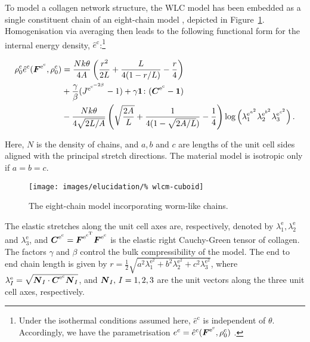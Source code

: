 To model a collagen network structure, the WLC model has been embedded
as a single constituent chain of an eight-chain model
\citep{Bischoffetal:2002, Bischoffetal1:2002}, depicted in
\mbox{Figure~\ref{eight-chain-model}}.  Homogenisation via averaging
then leads to the following functional form for the internal energy
density, $\hat{e}^\mathrm{c}$:\footnote{Under the isothermal
  conditions assumed here, $\hat{e}^\mathrm{c}$ is independent of
  $\theta$. Accordingly, we have the parametrisation
  ${e}^\mathrm{c}=\hat{e}^\mathrm{c}
  (\mbox{\boldmath$ F$}^{\mathrm{e}^\mathrm{c}},\rho^\mathrm{c}_{0})$ .}

\begin{equation}
\begin{split}
\rho^\mathrm{c}_{0}\hat{e}^\mathrm{c}
(\mbox{\boldmath$ F$}^{\mathrm{e}^\mathrm{c}},\rho^\mathrm{c}_{0}) &= \frac{N k
  \theta}{4 A}\left(\frac{r^2}{2L} + \frac{L}{4(1-r/L)} -
\frac{r}{4}\right)\\ & +
\frac{\gamma}{\beta}({J^{\mathrm{e}^{\mathrm{c}^{-2\beta}}}} -1) +
\gamma{\bf 1}\colon(\mbox{\boldmath$ C$}^{\mathrm{e}^{\mathrm{c}}}-{\bf 1})\\ &-\frac{N
  k \theta}{4\sqrt{2L/A}}\left(\sqrt{\frac{2A}{L}} + \frac{1}{4(1 -
  \sqrt{2A/L})} -\frac{1}{4} \right)
\log\left(\lambda_1^{{\mathrm{e}}^{a^\mathrm{2}}}
\lambda_2^{{\mathrm{e}}^{b^\mathrm{2}}}
\lambda_3^{{\mathrm{e}}^{c^\mathrm{2}}}\right).
\label{wlcm-energy}
\end{split}
\end{equation}

Here, $N$ is the density of chains, and $a,b$ and $c$ are lengths of
the unit cell sides aligned with the principal stretch directions. The
material model is isotropic only if $a=b=c$.

\begin{figure}
  \centering {}  
    
   
  \texttt{[image: images/elucidation/\%
    wlcm-cuboid]}
  \caption{The eight-chain model incorporating worm-like chains.}
  \label{eight-chain-model}
\end{figure}

The elastic stretches along the unit cell axes are, respectively,
denoted by $\lambda_1^{\mathrm{e}}, \lambda_2^{\mathrm{e}}$ and
$\lambda_3^{\mathrm{e}}$, and $\mbox{\boldmath$ C$}^{\mathrm{e}^{\mathrm{c}}} =
\mbox{\boldmath$ F$}^{\mathrm{e}^{\mathrm{c}^{\mathrm{T}}}}
\mbox{\boldmath$ F$}^{\mathrm{e}^{\mathrm{c}}}$ is the elastic right Cauchy-Green
tensor of collagen. The factors $\gamma$ and $\beta$ control the bulk
compressibility of the model. The end to end chain length is given by
$r = \frac{1}{2}\sqrt{a^2\lambda_1^{\mathrm{e}^2} +
  b^2\lambda_2^{\mathrm{e}^2}+c^2\lambda_3^{\mathrm{e}^2}}$, where
$\lambda^\mathrm{e}_I =
\sqrt{\mbox{\boldmath$ N$}_I\cdot\mbox{\boldmath$ C$}^{\mathrm{e}^{\mathrm{c}}}\mbox{\boldmath$ N$}_I}$, and $\mbox{\boldmath$ N$}_I,\,I =
1,2,3$ are the unit vectors along the three unit cell axes,
respectively.

